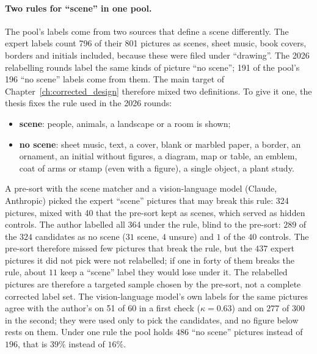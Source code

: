 \paragraph{Two rules for ``scene'' in one pool.} The pool's labels come from two sources that define a scene differently. The expert labels count 796 of their 801 pictures as scenes, sheet music, book covers, borders and initials included, because these were filed under ``drawing''. The 2026 relabelling rounds label the same kinds of picture ``no scene''; 191 of the pool's 196 ``no scene'' labels come from them. The main target of Chapter~\ref{ch:corrected_design} therefore mixed two definitions. To give it one, the thesis fixes the rule used in the 2026 rounds:
\begin{itemize}
    \item \textbf{scene}: people, animals, a landscape or a room is shown;
    \item \textbf{no scene}: sheet music, text, a cover, blank or marbled paper, a border, an ornament, an initial without figures, a diagram, map or table, an emblem, coat of arms or stamp (even with a figure), a single object, a plant study.
\end{itemize}
A pre-sort with the scene matcher and a vision-language model (Claude, Anthropic) picked the expert ``scene'' pictures that may break this rule: 324 pictures, mixed with 40 that the pre-sort kept as scenes, which served as hidden controls. The author labelled all 364 under the rule, blind to the pre-sort: $289$ of the $324$ candidates as no scene ($31$ scene, $4$ unsure) and $1$ of the $40$ controls. The pre-sort therefore missed few pictures that break the rule, but the $437$ expert pictures it did not pick were not relabelled; if one in forty of them breaks the rule, about $11$ keep a ``scene'' label they would lose under it. The relabelled pictures are therefore a targeted sample chosen by the pre-sort, not a complete corrected label set. The vision-language model's own labels for the same pictures agree with the author's on 51 of 60 in a first check ($\kappa = 0.63$) and on $277$ of $300$ in the second; they were used only to pick the candidates, and no figure below rests on them. Under one rule the pool holds $486$ ``no scene'' pictures instead of $196$, that is $39\%$ instead of $16\%$.

